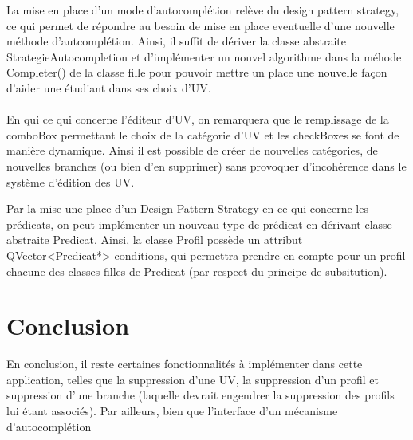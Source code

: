 \documentclass[a4paper,10pt,french]{report}
\begin{document}
	La mise en place d'un mode d'autocomplétion relève du design pattern strategy, ce qui permet de répondre au besoin de mise en place eventuelle d'une nouvelle méthode d'autcomplétion.
	Ainsi, il suffit de dériver la classe abstraite StrategieAutocompletion et d'implémenter un nouvel algorithme dans la méhode Completer() de la classe fille pour pouvoir mettre un place une nouvelle façon d'aider une étudiant dans ses choix d'UV.\\\\
	
	En qui ce qui concerne l'éditeur d'UV, on remarquera que le remplissage de la comboBox permettant le choix de la catégorie d'UV et les checkBoxes se font de manière dynamique. Ainsi il est possible de créer de nouvelles catégories, de nouvelles branches (ou bien d'en supprimer) sans provoquer d'incohérence dans le système d'édition des UV.
	
    Par la mise une place d'un Design Pattern Strategy en ce qui concerne les prédicats, on peut implémenter un nouveau type de prédicat en dérivant classe abstraite Predicat.
    Ainsi, la classe Profil possède un attribut QVector<Predicat*> conditions, qui permettra prendre en compte pour un profil chacune des classes filles de Predicat (par respect du principe de subsitution).
    
	
	
	
	
	
\newpage			
\section*{Conclusion}\label{sec:Conclusion}

En conclusion, il reste certaines fonctionnalités à implémenter dans cette application, telles que la suppression d'une UV, la suppression d'un profil et suppression d'une branche (laquelle devrait engendrer la suppression des profils lui étant associés).
Par ailleurs, bien que l'interface d'un mécanisme d'autocomplétion 





%
%

\end{document}
